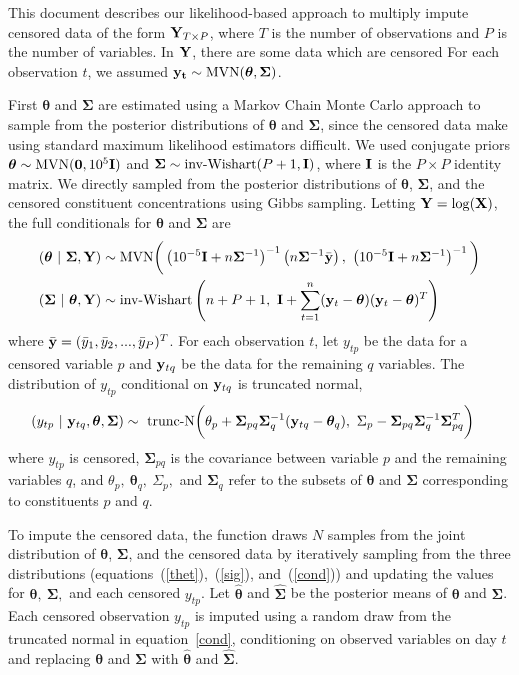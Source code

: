 \documentclass{article}
\begin{document}
This document describes our likelihood-based approach to multiply impute censored data of the form ${\bf Y}_{T\times P}$, where $T$ is the number of observations and $P$ is the number of variables.  In ${\bf Y}$, there are some data which are censored For each observation $t$, we assumed ${\bf y_t}\sim \text{MVN}({\bm \theta},{\bm \Sigma})$.  

First ${\bm \theta}$ and ${\bm \Sigma}$ are estimated using a Markov Chain Monte Carlo approach to sample from the posterior distributions of ${\bm \theta}$ and ${\bm \Sigma}$, since the censored data make using standard maximum likelihood estimators difficult.  We used conjugate priors ${\bm \theta}\sim \text{MVN} ({\bf 0}, 10^5 {\bf I})$ and ${\bm \Sigma}\sim \text{inv-Wishart}(P+1, {\bf I})$, where ${\bf I}$ is the $P\times P$ identity matrix.  We directly sampled from the posterior distributions of ${\bm \theta}$, ${\bm \Sigma}$, and the censored constituent concentrations using Gibbs sampling.  Letting ${\bf Y}=\log({\bf X})$, the full conditionals for ${\bm \theta}$ and ${\bm \Sigma}$ are
\begin{align}
({\bm \theta}~|~{\bm \Sigma},{\bf Y}) &\sim \text{MVN}\bigg(\left(10^{-5} {\bf I} + n{\bm \Sigma}^{-1}\right)^{-1} \left(  n {\bm \Sigma}^{-1} {\bar{{{\bf y}}}} \right),~\left(10^{-5}  {\bf I} + n{\bm \Sigma}^{-1}\right)^{-1} \bigg) \label{thet}\\
({\bm \Sigma} ~|~ {\bm \theta}, {\bf Y}) &\sim \text{inv-Wishart}\left(n + P + 1,~  {\bf I} + \sum_{t=1}^n({\bf y}_{t} - {\bm \theta})({\bf y}_t-{\bm \theta})^T\right) \label{sig} 
\end{align}
where $\bar{{\bf y}}=(\bar{y}_1, \bar{y}_2,...,\bar{y}_P)^T$.  For each observation $t$, let ${{ y}}_{tp}$ be the data for a censored variable $p$ and ${\bf y}_{tq}$ be the data for the remaining $q$ variables.  The distribution of ${ y}_{tp}$ conditional on ${\bf y}_{tq}$ is truncated normal,
\begin{align}
({ y}_{tp} ~|~ {\bf y}_{tq}, {\bm \theta},{\bm \Sigma}) &\sim \text{ trunc-N}\bigg({ \theta}_{p} + {\bm \Sigma}_{pq}{\bm \Sigma}_{ q}^{-1}({\bf y}_{{tq}}-{\bm \theta}_{{q}}), ~{ \Sigma}_{p} - {\bm \Sigma}_{pq}{\bm \Sigma}_{q}^{-1}{\bm \Sigma}_{pq}^T\bigg) \label{cond}
\end{align}
where ${ y}_{tp}$ is censored, ${\bm \Sigma}_{pq}$ is the covariance between variable $p$ and the remaining variables $q$, and
$\theta_p,~{\bm \theta}_q,~\Sigma_p,$ and ${\bm \Sigma}_q$ refer to the subsets of ${\bm\theta}$ and ${\bm \Sigma}$ corresponding to constituents $p$ and $q$. 

To impute the censored data, the function draws $N$ samples from the joint distribution of ${\bm \theta}$, ${\bm \Sigma}$, and the censored data by iteratively sampling from the three distributions (equations~(\ref{thet}),~(\ref{sig}), and~(\ref{cond})) and updating the values for ${\bm \theta},~{\bm \Sigma},$ and each censored $y_{tp}$.  Let $\hat{{\bm \theta}}$ and $\hat{\bm \Sigma}$ be the posterior means of  ${\bm \theta}$ and ${\bm \Sigma}$.  Each censored observation $y_{tp}$ is imputed using a random draw from the truncated normal in equation~\ref{cond}, conditioning on observed variables on day $t$ and replacing ${{\bm \theta}}$ and ${\bm \Sigma}$ with $\hat{{\bm \theta}}$ and $\hat{\bm \Sigma}$.  
\end{document}
